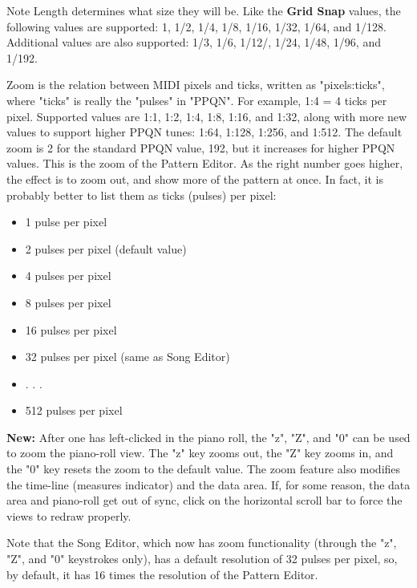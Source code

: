    Note Length determines what size they will be.
   Like the \textbf{Grid Snap} values,
   the following values are supported:
   1, 1/2, 1/4, 1/8, 1/16, 1/32, 1/64, and 1/128.
   Additional values are also supported:
   1/3, 1/6, 1/12/, 1/24, 1/48, 1/96, and 1/192.

   Zoom is the relation between MIDI pixels and ticks, written as
   "pixels:ticks", where "ticks" is really the "pulses" in "PPQN".
   For example, 1:4 = 4 ticks per pixel.
   Supported values are 1:1, 1:2, 1:4, 1:8, 1:16, and 1:32, along with
   more new values to support higher PPQN tunes: 1:64, 1:128, 1:256, and
   1:512.
   The default zoom is 2 for the standard PPQN value, 192, but it
   increases for higher PPQN values.
   This is the zoom of the Pattern Editor.  As the right number goes higher,
   the effect is to zoom out, and show more of the pattern at once.
   In fact, it is probably better to list them as ticks (pulses) per pixel:

   \begin{itemize}
      \item 1 pulse per pixel
      \item 2 pulses per pixel (default value)
      \item 4 pulses per pixel
      \item 8 pulses per pixel
      \item 16 pulses per pixel
      \item 32 pulses per pixel (same as Song Editor)
      \item . . .
      \item 512 pulses per pixel
   \end{itemize}

   \textbf{New:}
   After one has left-clicked in the piano roll, the "z", "Z", and "0"
   can be used to zoom the piano-roll view.  The "z" key zooms out, the "Z" key
   zooms in, and the "0" key resets the zoom to the default value.
   The zoom feature also modifies the time-line (measures indicator) and
   the data area.
   If, for some reason, the data area and piano-roll get out of sync, click on
   the horizontal scroll bar to force the views to redraw properly.

   Note that the Song Editor, which now has zoom functionality (through
   the "z", "Z", and "0" keystrokes only),
   has a default resolution of 32 pulses per pixel, so, by default, it has
   16 times the resolution of the Pattern Editor.

